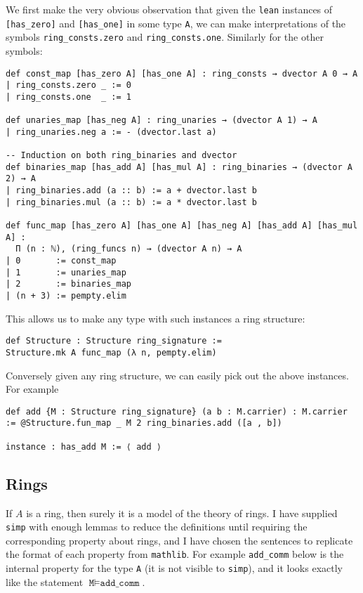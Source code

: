 We first make the very obvious observation that given
the \texttt{lean} instances of \texttt{[has\_zero]} and \texttt{[has\_one]}
in some type \texttt{A},
we can make interpretations of the symbols \texttt{ring\_consts.zero}
and \texttt{ring\_consts.one}.
Similarly for the other symbols:

\begin{lstlisting}
def const_map [has_zero A] [has_one A] : ring_consts → dvector A 0 → A
| ring_consts.zero _ := 0
| ring_consts.one  _ := 1

def unaries_map [has_neg A] : ring_unaries → (dvector A 1) → A
| ring_unaries.neg a := - (dvector.last a)

-- Induction on both ring_binaries and dvector
def binaries_map [has_add A] [has_mul A] : ring_binaries → (dvector A 2) → A
| ring_binaries.add (a :: b) := a + dvector.last b
| ring_binaries.mul (a :: b) := a * dvector.last b

def func_map [has_zero A] [has_one A] [has_neg A] [has_add A] [has_mul A] :
  Π (n : ℕ), (ring_funcs n) → (dvector A n) → A
| 0       := const_map
| 1       := unaries_map
| 2       := binaries_map
| (n + 3) := pempty.elim\end{lstlisting}

This allows us to make any type with such instances a ring structure:

\begin{lstlisting}
def Structure : Structure ring_signature :=
Structure.mk A func_map (λ n, pempty.elim)\end{lstlisting}

Conversely given any ring structure,
we can easily pick out the above instances.
For example
\begin{lstlisting}
def add {M : Structure ring_signature} (a b : M.carrier) : M.carrier := @Structure.fun_map _ M 2 ring_binaries.add ([a , b])

instance : has_add M := ⟨ add ⟩\end{lstlisting}

\subsection{Rings}
If $A$ is a ring, then surely it is a model of the theory of rings.
I have supplied \texttt{simp} with enough lemmas to reduce the definitions
until requiring the corresponding property about rings,
and I have chosen the sentences to replicate the format of
each property from \texttt{mathlib}.
For example \texttt{add\_comm} below
is the internal property for the type \texttt{A}
(it is not visible to \texttt{simp}),
and it looks exactly like the statement $\texttt{M} \vDash \texttt{add\_comm}$.

